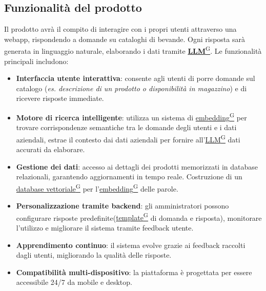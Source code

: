 \subsection{Funzionalità del prodotto}
Il prodotto avrà il compito di interagire con i propri utenti attraverso una webapp, rispondendo a domande su cataloghi di bevande. Ogni risposta sarà generata in linguaggio naturale, elaborando i dati tramite \href{https://code7crusaders.github.io/docs/RTB/documentazione_interna/glossario.html#llm-large-language-model}{\textbf{LLM}\textsuperscript{G}}. Le funzionalità principali includono:
\begin{itemize}
    \item \textbf{Interfaccia utente interattiva}: consente agli utenti di porre domande sul catalogo (\textit{es. descrizione di un prodotto o disponibilità in magazzino}) e di ricevere risposte immediate.
    \item \textbf{Motore di ricerca intelligente}: utilizza un sistema di \href{https://code7crusaders.github.io/docs/RTB/documentazione_interna/glossario.html#embedding}{embedding\textsuperscript{G}} per trovare corrispondenze semantiche tra le domande degli utenti e i dati aziendali, estrae il contesto dai dati aziendali per fornire all'\href{https://code7crusaders.github.io/docs/RTB/documentazione_interna/glossario.html#llm-large-language-model}{LLM\textsuperscript{G}} dati accurati da elaborare.
    \item \textbf{Gestione dei dati}: accesso ai dettagli dei prodotti memorizzati in database relazionali, garantendo aggiornamenti in tempo reale. Costruzione di un \href{https://code7crusaders.github.io/docs/RTB/documentazione_interna/glossario.html#database-vettoriale}{database vettoriale\textsuperscript{G}} per l'\href{https://code7crusaders.github.io/docs/RTB/documentazione_interna/glossario.html#embedding}{embedding\textsuperscript{G}} delle parole.
    \item \textbf{Personalizzazione tramite backend}: gli amministratori possono configurare risposte predefinite(\href{https://code7crusaders.github.io/docs/RTB/documentazione_interna/glossario.html#template}{template\textsuperscript{G}} di domanda e risposta), monitorare l’utilizzo e migliorare il sistema tramite feedback utente.
    \item \textbf{Apprendimento continuo}: il sistema evolve grazie ai feedback raccolti dagli utenti, migliorando la qualità delle risposte.
    \item \textbf{Compatibilità multi-dispositivo}: la piattaforma è progettata per essere accessibile 24/7 da mobile e desktop.
\end{itemize}

